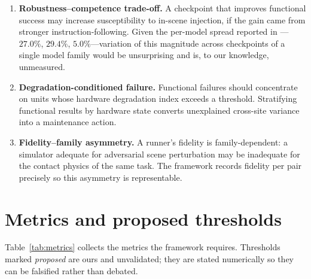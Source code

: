 \documentclass[11pt]{article}
\theoremstyle{definition}
\newcommand{\term}[1]{\emph{#1}}
\begin{document}
\begin{enumerate}[leftmargin=1.4em]
  \item \textbf{Robustness--competence trade-off.} A checkpoint that improves functional
  success may increase susceptibility to in-scene injection, if the gain came from stronger
  instruction-following. Given the per-model spread reported in \citep{paperhijack}---$27.0\%$,
  $29.4\%$, $5.0\%$---variation of this magnitude across checkpoints of a single model family
  would be unsurprising and is, to our knowledge, unmeasured.
  \item \textbf{Degradation-conditioned failure.} Functional failures should concentrate on
  units whose hardware degradation index exceeds a threshold. Stratifying functional results
  by hardware state converts unexplained cross-site variance into a maintenance action.
  \item \textbf{Fidelity--family asymmetry.} A runner's fidelity is family-dependent: a
  simulator adequate for adversarial scene perturbation may be inadequate for the contact
  physics of the same task. The framework records fidelity per pair precisely so this
  asymmetry is representable.
\end{enumerate}

\section{Metrics and proposed thresholds}
\label{sec:metrics}

Table~\ref{tab:metrics} collects the metrics the framework requires. Thresholds marked
\term{proposed} are ours and unvalidated; they are stated numerically so they can be
falsified rather than debated.
\end{document}

